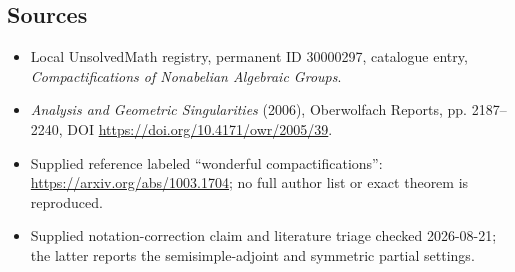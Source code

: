 \documentclass[11pt]{article}
\begin{document}
\subsection{Sources}
\begin{itemize}
\item Local UnsolvedMath registry, permanent ID 30000297, catalogue entry, \emph{Compactifications of Nonabelian Algebraic Groups}.
\item \emph{Analysis and Geometric Singularities} (2006), Oberwolfach Reports, pp. 2187--2240, DOI \url{https://doi.org/10.4171/owr/2005/39}.
\item Supplied reference labeled ``wonderful compactifications'': \url{https://arxiv.org/abs/1003.1704}; no full author list or exact theorem is reproduced.
\item Supplied notation-correction claim and literature triage checked 2026-08-21; the latter reports the semisimple-adjoint and symmetric partial settings.
\end{itemize}
\end{document}
